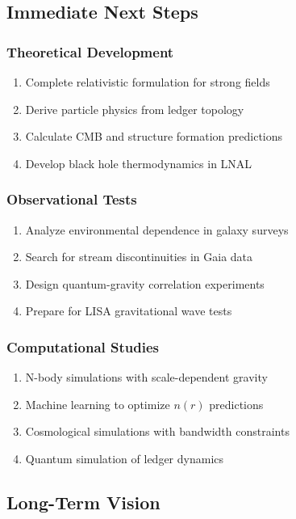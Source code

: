 \documentclass[12pt,letterpaper]{article}
\begin{document}
\subsection{Immediate Next Steps}

\subsubsection{Theoretical Development}
\begin{enumerate}
    \item Complete relativistic formulation for strong fields
    \item Derive particle physics from ledger topology
    \item Calculate CMB and structure formation predictions
    \item Develop black hole thermodynamics in LNAL
\end{enumerate}

\subsubsection{Observational Tests}
\begin{enumerate}
    \item Analyze environmental dependence in galaxy surveys
    \item Search for stream discontinuities in Gaia data
    \item Design quantum-gravity correlation experiments
    \item Prepare for LISA gravitational wave tests
\end{enumerate}

\subsubsection{Computational Studies}
\begin{enumerate}
    \item N-body simulations with scale-dependent gravity
    \item Machine learning to optimize $n(r)$ predictions
    \item Cosmological simulations with bandwidth constraints
    \item Quantum simulation of ledger dynamics
\end{enumerate}

\subsection{Long-Term Vision}
\end{document}
